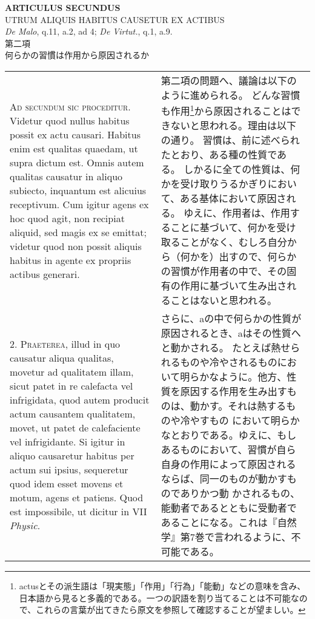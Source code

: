 \documentclass[10pt]{jsarticle} %
\begin{document}
\begin{center}
{\Large {\bf ARTICULUS SECUNDUS}}\\
{\large UTRUM ALIQUIS HABITUS CAUSETUR EX ACTIBUS}\\
{\footnotesize {\itshape De Malo}, q.11, a.2, ad 4; {\itshape De
 Virtut.}, q.1, a.9.}\\
{\Large 第二項\\何らかの習慣は作用から原因されるか}
\end{center}

\begin{longtable}{p{21em}p{21em}}

{\scshape Ad secundum sic proceditur}. Videtur quod nullus habitus possit ex actu
 causari. Habitus enim est qualitas quaedam, ut supra dictum
 est. Omnis autem qualitas causatur in aliquo subiecto, inquantum est
 alicuius receptivum. Cum igitur agens ex hoc quod agit, non recipiat
 aliquid, sed magis ex se emittat; videtur quod non possit aliquis
 habitus in agente ex propriis actibus generari.

&

第二項の問題へ、議論は以下のように進められる。
どんな習慣も作用\footnote{actusとその派生語は「現実態」「作用」「行為」「能動」などの意味を含み、日本語から見ると多義的である。一つの訳語を割り当てることは不可能なので、これらの言葉が出てきたら原文を参照して確認することが望ましい。}から原因されることはできないと思われる。理由は以下の通り。
習慣は、前に述べられたとおり、ある種の性質である。
しかるに全ての性質は、何かを受け取りうるかぎりにおいて、ある基体において原因される。
ゆえに、作用者は、作用することに基づいて、何かを受け取ることがなく、むしろ自分から（何かを）出すので、何らかの習慣が作用者の中で、その固有の作用に基づいて生み出されることはないと思われる。


\\




2. {\scshape Praeterea}, illud in quo causatur aliqua qualitas, movetur ad
 qualitatem illam, sicut patet in re calefacta vel infrigidata, quod
 autem producit actum causantem qualitatem, movet, ut patet de
 calefaciente vel infrigidante. Si igitur in aliquo causaretur habitus
 per actum sui ipsius, sequeretur quod idem esset movens et motum,
 agens et patiens. Quod est impossibile, ut dicitur in VII {\itshape Physic}.

&

さらに、aの中で何らかの性質が原因されるとき、aはその性質へと動かされる。
たとえば熱せられるものや冷やされるものにおいて明らかなように。他方、性
質を原因する作用を生み出すものは、動かす。それは熱するものや冷やすもの
において明らかなとおりである。ゆえに、もしあるものにおいて、習慣が自ら
自身の作用によって原因されるならば、同一のものが動かすものでありかつ動
かされるもの、能動者であるとともに受動者であることになる。これは『自然
学』第7巻で言われるように、不可能である。



\end{longtable}
\end{document}
